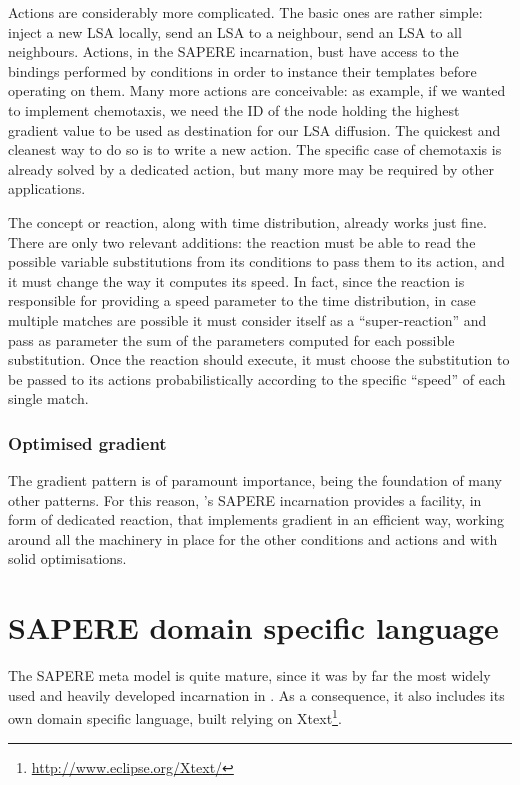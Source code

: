 \documentclass[12pt,a4paper,twoside,openright]{book}
\begin{document}
Actions are considerably more complicated.
%
The basic ones are rather simple: inject a new LSA locally, send an LSA to a neighbour, send an LSA to all neighbours.
%
Actions, in the SAPERE incarnation, bust have access to the bindings performed by conditions in order to instance their templates before operating on them.
%
Many more actions are conceivable: as example, if we wanted to implement chemotaxis, we need the ID of the node holding the highest gradient value to be used as destination for our LSA diffusion.
%
The quickest and cleanest way to do so is to write a new action.
%
The specific case of chemotaxis is already solved by a dedicated action, but many more may be required by other applications.

The concept or reaction, along with time distribution, already works just fine.
%
There are only two relevant additions: the reaction must be able to read the possible variable substitutions from its conditions to pass them to its action, and it must change the way it computes its speed.
%
In fact, since the reaction is responsible for providing a speed parameter to the time distribution, in case multiple matches are possible it must consider itself as a ``super-reaction'' and pass as parameter the sum of the parameters computed for each possible substitution.
%
Once the reaction should execute, it must choose the substitution to be passed to its actions probabilistically according to the specific ``speed'' of each single match.

\subsubsection{Optimised gradient}

The gradient pattern is of paramount importance, being the foundation of many other patterns.
%
For this reason, \alchemist{}'s SAPERE incarnation provides a facility, in form of dedicated reaction, that implements gradient in an efficient way, working around all the machinery in place for the other conditions and actions and with solid optimisations.

\section{SAPERE domain specific language}

The SAPERE meta model is quite mature, since it was by far the most widely used and heavily developed incarnation in \alchemist{}.
%
As a consequence, it also includes its own domain specific language, built relying on Xtext\footnote{\url{http://www.eclipse.org/Xtext/}}.
\end{document}
